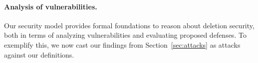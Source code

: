 \paragraph{Analysis of vulnerabilities.} Our security model provides formal foundations to reason about deletion security, both in terms of analyzing vulnerabilities and evaluating proposed defenses. To exemplify this, we now cast our findings from Section~\ref{sec:attacks} as attacks against our definitions.

